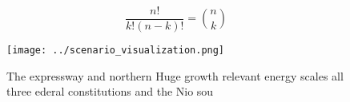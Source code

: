 \documentclass[a4paper]{article}
\begin{document}
\[ \frac{n!}{k!(n-k)!} = \binom{n}{k} \]

\begin{figure}
\centering
\texttt{[image: ../scenario\_visualization.png]}
\caption{The expressway and northern Huge growth relevant energy scales all three ederal constitutions and the Nio sou
}
\end{figure}
 
\end{document}
